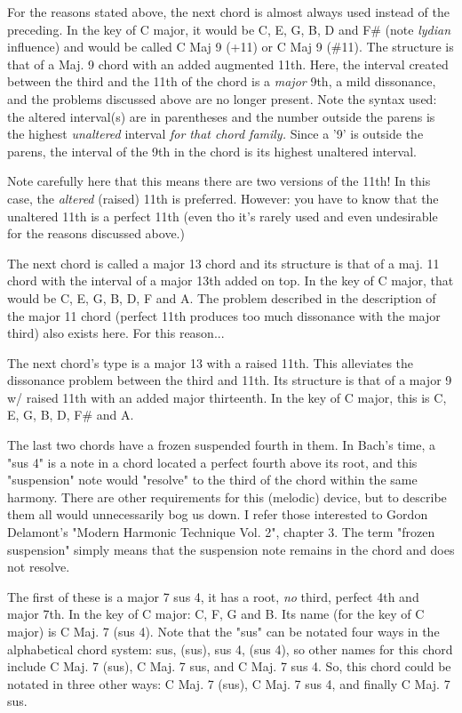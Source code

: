 For the reasons stated above, the next chord is almost always used instead of 
the preceding. In the key of C major, it would be C, E, G, B, D and F\# (note 
\emph{lydian} influence) and would be called C Maj 9 (+11) or C Maj 9 (\#11).
The structure is that of a Maj. 9 chord with an added augmented 11th.
Here, the interval created between the third and the 11th of the chord is 
a \emph{major} 9th, a mild dissonance, and the problems discussed above are no 
longer present. Note the syntax used: the altered interval(s) are in 
parentheses and the number outside the parens is the highest \emph{unaltered} 
interval \emph{for that chord family.} Since a '9' is outside the parens, the 
interval of the 9th in the chord is its highest unaltered interval.

Note carefully here that this means there are two versions of the 11th! 
In this case, the \emph{altered} (raised) 11th is preferred. However: you have 
to know that the unaltered 11th is a perfect 11th (even tho it's rarely 
used and even undesirable for the reasons discussed above.)

The next chord is called a major 13 chord and its structure is that of a 
maj. 11 chord with the interval of a major 13th added on top. In the key
of C major, that would be C, E, G, B, D, F and A. The problem described 
in the description of the major 11 chord (perfect 11th produces too much 
dissonance with the major third) also exists here. For this reason...

The next chord's type is a major 13 with a raised 11th. This alleviates 
the dissonance problem between the third and 11th. Its structure is that 
of a major 9 w/ raised 11th with an added major thirteenth. In the key of 
C major, this is C, E, G, B, D, F\# and A.

The last two chords have a frozen suspended fourth in them. In Bach's 
time, a "sus 4" is a note in a chord located a perfect fourth above its
root, and this "suspension" note would "resolve" to the third of the 
chord within the same harmony. There are other requirements for this 
(melodic) device, but to describe them all would unnecessarily bog us 
down. I refer those interested to Gordon Delamont's "Modern Harmonic 
Technique Vol. 2", chapter 3. The term "frozen suspension" simply means
that the suspension note remains in the chord and does not resolve.

The first of these is a major 7 sus 4, it has a root, \emph{no} third, perfect 
4th and major 7th. In the key of C major: C, F, G and B. Its name (for the
key of C major) is C Maj. 7 (sus 4). Note that the "sus" can be notated 
four ways in the alphabetical chord system: sus, (sus), sus 4, (sus 4), 
so other names for this chord include C Maj. 7 (sus), C Maj. 7 sus, and 
C Maj. 7 sus 4. So, this chord could be notated in three other ways:
C Maj. 7 (sus), C Maj. 7 sus 4, and finally C Maj. 7 sus. 

